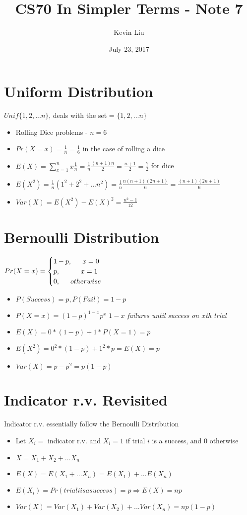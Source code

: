 \documentclass[a4paper]{article}
\title{CS70 In Simpler Terms - Note 7}
\author{Kevin Liu}
\date{July 23, 2017}
\begin{document}
\maketitle

\section{Uniform Distribution}
$Unif\{1,2,...n\}$, deals with the set = $\{1,2, ... n\}$
\begin{itemize}
    \item Rolling Dice problems - $n = 6$
    \item $Pr(X=x) = \frac{1}{n} = \frac{1}{6}$ in the case of rolling a dice
    \item $E(X) = \sum_{x=1}^n x\frac{1}{n} = \frac{1}{n}\frac{(n+1)n}{2} =\frac{n+1}{2} = \frac{7}{2}$ for dice
    \item $E(X^2) = \frac{1}{n}(1^2 + 2^2 + ... n^2) = \frac{1}{n}\frac{n(n+1)(2n+1)}{6} =\frac{(n+1)(2n+1)}{6}$
    \item $Var(X) = E(X^2) - E(X)^2 = \frac{n^2 -1}{12}$
\end{itemize}

\section{Bernoulli Distribution}
$Pr(X=x) =
\begin{cases}
1-p,\indent x=0\\
p, \indent\indent x = 1\\
0,\indent otherwise
\end{cases}$
\begin{itemize}
    \item $P(Success) = p, P(Fail) = 1-p$ 
    \item $P(X=x) = (1-p)^{1-x}p^x$ \textit{$1-x$ failures until success on $x$th trial}
    \item $E(X) = 0 * (1-p) + 1*P(X=1) = p$
    \item $E(X^2) = 0^2 * (1-p) + 1^2*p = E(X) = p$
    \item $Var(X) = p - p^2 = p(1-p)$
\end{itemize}

\section{Indicator r.v. Revisited}
Indicator r.v. essentially follow the Bernoulli Distribution
\begin{itemize}
    \item Let $X_i = $ indicator r.v. and $X_i = 1$ if trial $i$ is a success, and $0$ otherwise
    \item $X = X_1 + X_2 + ... X_n$
    \item $E(X) = E(X_1 + ... X_n) = E(X_1) + ... E(X_n)$
    \item $E(X_i) = Pr(trial i is a success) = p \Rightarrow E(X) = np$
    \item $Var(X) = Var(X_1) + Var(X_2) +... Var(X_n) = np(1-p)$
\end{itemize}
\end{document}
